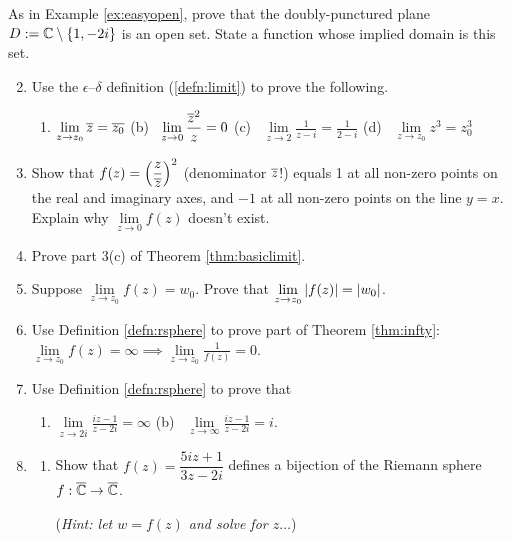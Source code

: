 \begin{exercises}{}{}
	\exstart As in Example \ref{ex:easyopen}, prove that the doubly-punctured plane $D:=\mathbb{C}\setminus\{1,-2i\}$ is an open set. State a function whose implied domain is this set.

	\begin{enumerate}\setcounter{enumi}{1}
	  \item Use the $\epsilon$--$\delta$ definition (\ref{defn:limit}) to prove the following.
	  \begin{enumerate}
	  	\item $\displaystyle\lim\limits_{z\to z_0}\overline{z}=\overline{z_0}$\qquad
	  	(b) \ $\displaystyle\lim\limits_{z\to 0}\frac{\overline{z}^2}z=0$\qquad
	  	(c) \ $\displaystyle\lim\limits_{z\to 2}\frac 1{z-i}=\frac 1{2-i}$\qquad
	  	(d) \ $\displaystyle\lim\limits_{z\to z_0}z^3=z_0^3$
	  \end{enumerate}
	  
	  
	  \item Show that $f(z)=\left(\dfrac z{\overline{z}}\right)^2$ (denominator $\overline{z}$!) equals 1 at all non-zero points on the real and imaginary axes, and $-1$ at all non-zero points on the line $y=x$. Explain why $\lim\limits_{z\to 0}f(z)$ doesn't exist.
	  
	  
	  \item Prove part 3(c) of Theorem \ref{thm:basiclimit}.
	  
	  
	  \item Suppose $\lim\limits_{z\to z_0}f(z)=w_0$. Prove that $\lim\limits_{z\to z_0}\left| f(z)\right|=\left| w_0\right|$.
	   
	   
	  \item Use Definition \ref{defn:rsphere} to prove part of Theorem \ref{thm:infty}: $\lim\limits_{z\to z_0}f(z)=\infty \implies \lim\limits_{z\to z_0}\frac 1{f(z)}=0$.
	  
	  
	  \item Use Definition \ref{defn:rsphere} to prove that
	  \begin{enumerate}
	    \item $\displaystyle\lim\limits_{z\to 2i}\frac{iz-1}{z-2i}=\infty$ \qquad (b) \ $\displaystyle\lim\limits_{z\to\infty}\frac{iz-1}{z-2i}=i$.
	  \end{enumerate}
	  
	  
	 	\item\begin{enumerate}
	    \item Show that $f(z)=\dfrac{5iz+1}{3z-2i}$ defines a bijection of the Riemann sphere $f:\overline{\mathbb{C}}\to\overline{\mathbb{C}}$.\par
	  	(\emph{Hint: let $w=f(z)$ and solve for $z\ldots$})
	  	

\end{enumerate}
\end{enumerate}
\end{exercises}
